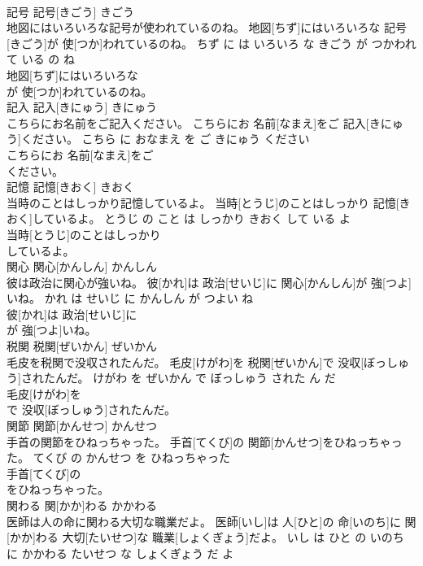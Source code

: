 \documentclass[8pt]{extreport}
\begin{document}
\begin{CJK}{UTF8}{min}
\\	記号	記号[きごう]	きごう	
\\	地図にはいろいろな記号が使われているのね。	地図[ちず]にはいろいろな 記号[きごう]が 使[つか]われているのね。	ちず に は いろいろ な きごう が つかわれて いる の ね	
\\	地図[ちず]にはいろいろな
\\	が 使[つか]われているのね。			
\\	記入	記入[きにゅう]	きにゅう	
\\	こちらにお名前をご記入ください。	こちらにお 名前[なまえ]をご 記入[きにゅう]ください。	こちら に おなまえ を ご きにゅう ください	
\\	こちらにお 名前[なまえ]をご
\\	ください。			
\\	記憶	記憶[きおく]	きおく	
\\	当時のことはしっかり記憶しているよ。	当時[とうじ]のことはしっかり 記憶[きおく]しているよ。	とうじ の こと は しっかり きおく して いる よ	
\\	当時[とうじ]のことはしっかり
\\	しているよ。			
\\	関心	関心[かんしん]	かんしん	
\\	彼は政治に関心が強いね。	彼[かれ]は 政治[せいじ]に 関心[かんしん]が 強[つよ]いね。	かれ は せいじ に かんしん が つよい ね	
\\	彼[かれ]は 政治[せいじ]に
\\	が 強[つよ]いね。			
\\	税関	税関[ぜいかん]	ぜいかん	
\\	毛皮を税関で没収されたんだ。	毛皮[けがわ]を 税関[ぜいかん]で 没収[ぼっしゅう]されたんだ。	けがわ を ぜいかん で ぼっしゅう された ん だ	
\\	毛皮[けがわ]を
\\	で 没収[ぼっしゅう]されたんだ。			
\\	関節	関節[かんせつ]	かんせつ	
\\	手首の関節をひねっちゃった。	手首[てくび]の 関節[かんせつ]をひねっちゃった。	てくび の かんせつ を ひねっちゃった	
\\	手首[てくび]の
\\	をひねっちゃった。			
\\	関わる	関[かか]わる	かかわる	
\\	医師は人の命に関わる大切な職業だよ。	医師[いし]は 人[ひと]の 命[いのち]に 関[かか]わる 大切[たいせつ]な 職業[しょくぎょう]だよ。	いし は ひと の いのち に かかわる たいせつ な しょくぎょう だ よ	

\end{CJK}
\end{document}
